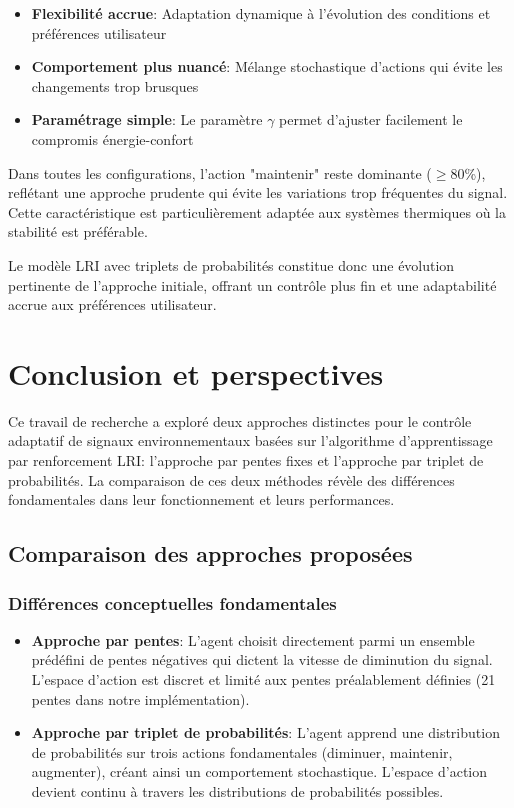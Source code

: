 \begin{itemize}
    \item \textbf{Flexibilité accrue}: Adaptation dynamique à l'évolution des conditions et préférences utilisateur
    \item \textbf{Comportement plus nuancé}: Mélange stochastique d'actions qui évite les changements trop brusques
    \item \textbf{Paramétrage simple}: Le paramètre $\gamma$ permet d'ajuster facilement le compromis énergie-confort
\end{itemize}

Dans toutes les configurations, l'action "maintenir" reste dominante ($\geq$80\%), reflétant une approche prudente qui évite les variations trop fréquentes du signal. Cette caractéristique est particulièrement adaptée aux systèmes thermiques où la stabilité est préférable.

Le modèle LRI avec triplets de probabilités constitue donc une évolution pertinente de l'approche initiale, offrant un contrôle plus fin et une adaptabilité accrue aux préférences utilisateur.

\section{Conclusion et perspectives}

Ce travail de recherche a exploré deux approches distinctes pour le contrôle adaptatif de signaux environnementaux basées sur l'algorithme d'apprentissage par renforcement LRI: l'approche par pentes fixes et l'approche par triplet de probabilités. La comparaison de ces deux méthodes révèle des différences fondamentales dans leur fonctionnement et leurs performances.

\subsection{Comparaison des approches proposées}

\subsubsection{Différences conceptuelles fondamentales}

\begin{itemize}
    \item \textbf{Approche par pentes}: L'agent choisit directement parmi un ensemble prédéfini de pentes négatives qui dictent la vitesse de diminution du signal. L'espace d'action est discret et limité aux pentes préalablement définies (21 pentes dans notre implémentation).
    
    \item \textbf{Approche par triplet de probabilités}: L'agent apprend une distribution de probabilités sur trois actions fondamentales (diminuer, maintenir, augmenter), créant ainsi un comportement stochastique. L'espace d'action devient continu à travers les distributions de probabilités possibles.
\end{itemize}

